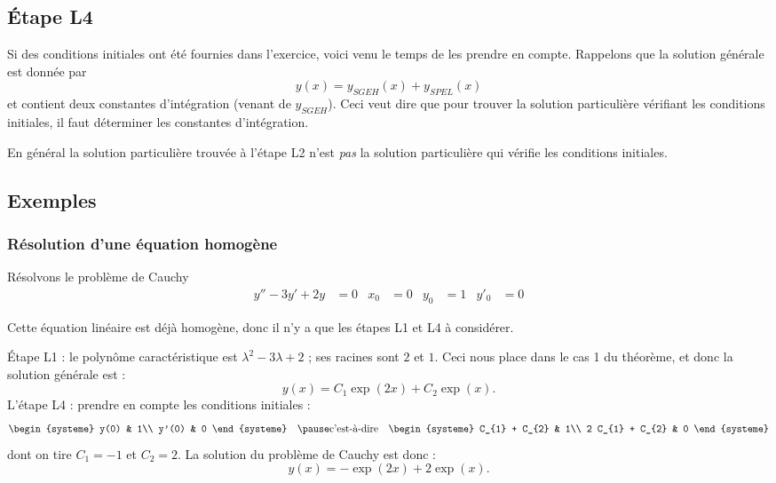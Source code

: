 \subsection{Étape L4}
\begin{frame}
Si des conditions initiales ont été fournies dans l'exercice, voici venu le temps de les prendre en compte. Rappelons que la solution générale est donnée par
\begin{equation*}
  y(x) = y_{SGEH}(x) + y_{SPEL}(x)
\end{equation*}
et contient deux constantes d'intégration (venant de \(y_{SGEH}\)). Ceci veut dire que pour trouver la solution particulière vérifiant les conditions initiales,\pause{} il faut déterminer les constantes d'intégration.

\begin{remark*}\pause
En général la solution particulière trouvée à l'étape L2 n'est \emph{pas} la solution particulière qui vérifie les conditions initiales.
\end{remark*}
\end{frame}

\subsection{Exemples}
\subsubsection{Résolution d'une équation homogène}
\begin{frame}
\label{sec:resol-dune-equat}
Résolvons le problème de Cauchy
\begin{align*}
y'' - 3 y' + 2y &= 0 & x_{0} &= 0& y_{0} &= 1& y'_{0} &= 0
\end{align*}
\begin{remark*}
  Cette équation linéaire est déjà homogène, donc il n'y a que les étapes L1 et L4 à considérer.
\end{remark*}

Étape L1 : le polynôme caractéristique est \(\lambda^{2} - 3\lambda + 2\) ; \pause ses racines sont \(2\) et \(1\). Ceci nous place dans le cas 1 du théorème\pause{}, et donc la solution générale est :\pause{}
\begin{equation*}
  y(x) = C_{1} \exp{(2x)} + C_{2}\exp{(x)}.
\end{equation*}\pause
L'étape L4 : prendre en compte les conditions initiales :\pause{}
\begin{equation*}
  \begin{systeme}
    y(0) & 1\\
    y'(0) & 0
  \end{systeme}
\quad\pause\text{c'est-à-dire}\quad
  \begin{systeme}
    C_{1} + C_{2} & 1\\
    2 C_{1} + C_{2} & 0
  \end{systeme}
\end{equation*}\pause
dont on tire \(C_{1} = -1\) et \(C_{2} = 2\).\pause{} La solution du problème de Cauchy est donc :\pause{}
\begin{equation*}
  y(x) = - \exp{(2x)} + 2 \exp{(x)}.
\end{equation*}
\end{frame}
